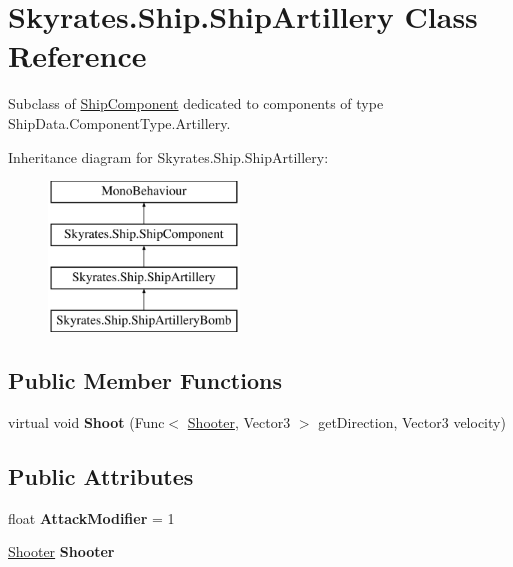 \hypertarget{class_skyrates_1_1_ship_1_1_ship_artillery}{\section{Skyrates.\-Ship.\-Ship\-Artillery Class Reference}
\label{class_skyrates_1_1_ship_1_1_ship_artillery}
}


Subclass of \hyperlink{class_skyrates_1_1_ship_1_1_ship_component}{Ship\-Component} dedicated to components of type Ship\-Data.\-Component\-Type.\-Artillery.  


Inheritance diagram for Skyrates.\-Ship.\-Ship\-Artillery\-:\begin{figure}[H]
\begin{center}
\leavevmode
\includegraphics[height=4.000000cm]{class_skyrates_1_1_ship_1_1_ship_artillery}
\end{center}
\end{figure}
\subsection*{Public Member Functions}
\begin{DoxyCompactItemize}
\item 
\hypertarget{class_skyrates_1_1_ship_1_1_ship_artillery_a1de4744b1907b1b7ef3f1e232086b7fa}{virtual void {\bfseries Shoot} (Func$<$ \hyperlink{class_skyrates_1_1_mono_1_1_shooter}{Shooter}, Vector3 $>$ get\-Direction, Vector3 velocity)}\label{class_skyrates_1_1_ship_1_1_ship_artillery_a1de4744b1907b1b7ef3f1e232086b7fa}

\end{DoxyCompactItemize}
\subsection*{Public Attributes}
\begin{DoxyCompactItemize}
\item 
\hypertarget{class_skyrates_1_1_ship_1_1_ship_artillery_a301c1be383de2793706f5b22f90b803a}{float {\bfseries Attack\-Modifier} = 1}\label{class_skyrates_1_1_ship_1_1_ship_artillery_a301c1be383de2793706f5b22f90b803a}

\item 
\hypertarget{class_skyrates_1_1_ship_1_1_ship_artillery_ae1cc615bfe49b8eeb089c2b36d7417f7}{\hyperlink{class_skyrates_1_1_mono_1_1_shooter}{Shooter} {\bfseries Shooter}}\label{class_skyrates_1_1_ship_1_1_ship_artillery_ae1cc615bfe49b8eeb089c2b36d7417f7}

\end{DoxyCompactItemize}


